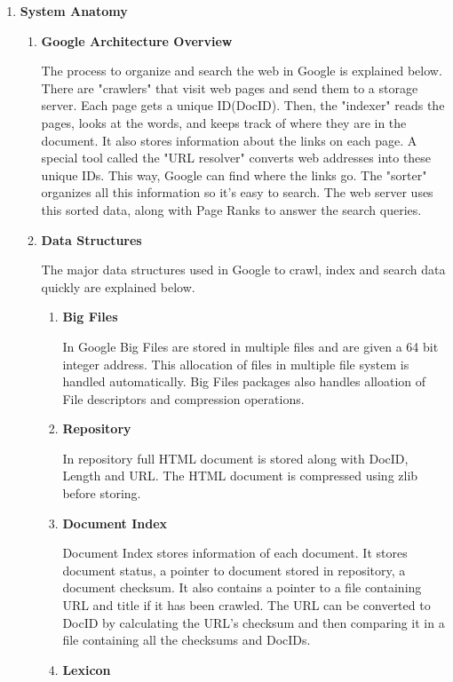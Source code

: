 \documentclass[a4paper, 12pt]{article}
\begin{document}
\begin{enumerate}
\item \textbf{System Anatomy}
\begin{enumerate}
    \item \textbf{Google Architecture Overview}
        The process to organize and search the web in Google is explained below.\\ There are "crawlers" that visit web pages and send them to a storage server. Each page gets a unique ID(DocID). Then, the "indexer" reads the pages, looks at the words, and keeps track of where they are in the document. It also stores information about the links on each page. A special tool called the "URL resolver" converts web addresses into these unique IDs. This way, Google can find where the links go. The "sorter" organizes all this information so it's easy to search. The web server uses this sorted data, along with Page Ranks to answer the search queries.
    \item \textbf{Data Structures}
        The major data structures used in Google to crawl, index and search data quickly are explained below.
        \begin{enumerate}
            \item \textbf{Big Files}
                In Google Big Files are stored in multiple files and are given a 64 bit integer address. This allocation of files in multiple file system is handled automatically. Big Files packages also handles alloation of File descriptors and compression operations.
            \item \textbf{Repository}
                In repository full HTML document is stored along with DocID, Length and URL. The HTML document is compressed using zlib before storing.
            \item \textbf{Document Index}
                Document Index stores information of each document. It stores document status, a pointer to document stored in repository, a document checksum. It also contains a pointer to a file containing URL and title if it has been crawled.
                The URL can be converted to DocID by calculating the URL's checksum and then comparing it in a file containing all the checksums and DocIDs.
            \item \textbf{Lexicon}

\end{enumerate}
\end{enumerate}
\end{enumerate}
\end{document}
